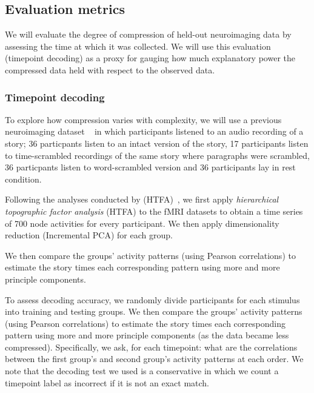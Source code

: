 \documentclass[english]{article}
\begin{document}


\subsection*{Evaluation metrics}
 We will evaluate the degree of
compression of held-out
neuroimaging data by assessing the time at which it was collected.  We will use this evaluation (timepoint
decoding) as a proxy for
gauging how much explanatory power the compressed data held
with respect to the observed data.



\subsubsection*{Timepoint decoding}

To explore how compression varies with complexity, we will use a previous neuroimaging dataset
~\cite{SimoEtal16}  in which participants listened to an audio recording of a story; 36 particpants listen to an intact version of the story, 17 participants listen to time-scrambled recordings of the same story where paragraphs were scrambled, 36 particpants listen to word-scrambled version and 36 participants lay in rest condition.


Following the analyses conducted by (HTFA)~\cite{MannEtal18}, we first
apply \textit{hierarchical topographic factor analysis} (HTFA) to
the fMRI datasets to obtain a time series of 700 node activities for
every participant.  We then apply dimensionality reduction
(Incremental PCA) for each group.

We then compare the groups’ activity patterns (using Pearson
correlations) to estimate the story times each corresponding pattern
using more and more principle components.   

To assess decoding accuracy, we randomly divide participants for each
stimulus into training and testing groups. We then compare the
groups’ activity patterns (using Pearson correlations) to estimate the
story times each corresponding pattern using more and more principle
components (as the data became less compressed). Specifically, we ask, for each timepoint: what are the correlations
between the first group's and second group's activity patterns at each
order. We note that the decoding test we used is a conservative in which we count a timepoint label as incorrect if it is not an exact match.
\end{document}
